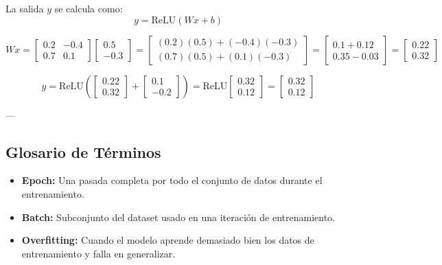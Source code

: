 \documentclass[11pt]{article} %
\begin{document}
La salida \(y\) se calcula como:
\[
y = \text{ReLU}(Wx + b)
\]

\[
Wx = \begin{bmatrix}
0.2 & -0.4 \\
0.7 & 0.1 
\end{bmatrix}
\begin{bmatrix}
0.5 \\
-0.3
\end{bmatrix}
= \begin{bmatrix}
(0.2)(0.5) + (-0.4)(-0.3) \\
(0.7)(0.5) + (0.1)(-0.3)
\end{bmatrix}
= \begin{bmatrix}
0.1 + 0.12 \\
0.35 - 0.03
\end{bmatrix}
= \begin{bmatrix}
0.22 \\
0.32
\end{bmatrix}
\]

\[
y = \text{ReLU}\left(
\begin{bmatrix}
0.22 \\
0.32
\end{bmatrix} + 
\begin{bmatrix}
0.1 \\
-0.2
\end{bmatrix}
\right)
= \text{ReLU}
\begin{bmatrix}
0.32 \\
0.12
\end{bmatrix}
= \begin{bmatrix}
0.32 \\
0.12
\end{bmatrix}
\]

---

\subsection{Glosario de Términos}
\begin{itemize}
    \item \textbf{Epoch:} Una pasada completa por todo el conjunto de datos durante el entrenamiento.
    \item \textbf{Batch:} Subconjunto del dataset usado en una iteración de entrenamiento.
    \item \textbf{Overfitting:} Cuando el modelo aprende demasiado bien los datos de entrenamiento y falla en generalizar.
\end{itemize}
\end{document}
